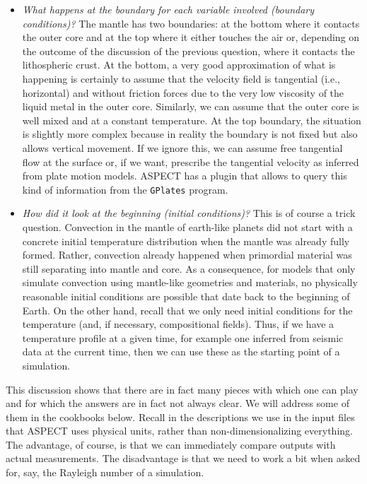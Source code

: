 \documentclass{article}
\newcommand{\aspect}{\textsc{ASPECT}}
\begin{document}
\begin{itemize}
  \item \textit{What happens at the boundary for each variable involved
      (boundary conditions)?}
    The mantle has two boundaries: at the bottom where it contacts the outer core
    and at the top where it either touches the air or, depending on the outcome
    of the discussion of the previous question, where it contacts the
    lithospheric crust. At the bottom, a very good approximation of what is
    happening is certainly to assume that the velocity field is tangential
    (i.e., horizontal) and without friction forces due to the very low viscosity
    of the liquid metal in the outer core. Similarly, we can assume that the
    outer core is well mixed and at a constant temperature. At the top boundary,
    the situation is slightly more complex because in reality the boundary is not
    fixed but also allows vertical movement. If we ignore this, we can assume
    free tangential flow at the surface or, if we want, prescribe the tangential
    velocity as inferred from plate motion models. \aspect{} has a plugin that
    allows to query this kind of information from the \texttt{GPlates} program.

  \item \textit{How did it look at the beginning (initial conditions)?}
    This is of course a trick question. Convection in the mantle of earth-like
    planets did not start with a concrete initial temperature distribution when
    the mantle was already fully formed. Rather, convection already happened
    when primordial material was still separating into mantle and core. As a
    consequence, for models that only simulate convection using mantle-like
    geometries and materials, no physically reasonable initial conditions are
    possible that date back to the beginning of Earth. On the other hand, recall
    that we only need initial conditions for the temperature (and, if
    necessary, compositional fields). Thus, if we have a temperature profile at
    a given time, for example one inferred from seismic data at the current
    time, then we can use these as the starting point of a simulation.
\end{itemize}

This discussion shows that there are in fact many pieces with which one can play
and for which the answers are in fact not always clear. We will address some of
them in the cookbooks below. Recall in the descriptions we use in the input
files that \aspect{} uses physical units, rather than non-dimensionalizing
everything. The advantage, of course, is that we can immediately compare outputs
with actual measurements. The disadvantage is that we need to work a bit when
asked for, say, the Rayleigh number of a simulation.
\end{document}
